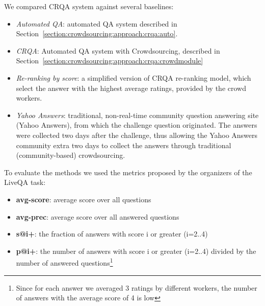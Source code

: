 We compared CRQA system against several baselines:
\begin{itemize}
\item \textit{Automated QA}: automated QA system described in Section~\ref{section:crowdsourcing:approach:crqa:auto}.
\item \textit{CRQA}: Automated QA system with Crowdsourcing, described in Section~\ref{section:crowdsourcing:approach:crqa:crowdmodule}
\item \textit{Re-ranking by score}: a simplified version of CRQA re-ranking model, which select the answer with the highest average ratings, provided by the crowd workers.
\item \textit{Yahoo Answers}: traditional, non-real-time community question answering site (Yahoo Answers), from which the challenge question originated. The answers were collected two days after the challenge, thus allowing the Yahoo Answers community extra two days to collect the answers through traditional (community-based) crowdsourcing.
\end{itemize}

To evaluate the methods we used the metrics proposed by the organizers of the LiveQA task:
\begin{itemize}
\item \textbf{avg-score}: average score over all questions
\item \textbf{avg-prec}: average score over all answered questions
\item \textbf{s@i+}: the fraction of answers with score i or greater (i=2..4)
\item \textbf{p@i+}: the number of answers with score i or greater (i=2..4) divided by the number of answered questions\footnote{Since for each answer we averaged 3 ratings by different workers, the number of answers with the average score of 4 is low}
\end{itemize}

